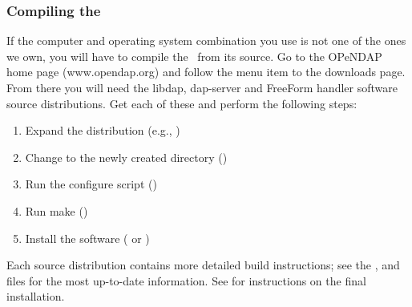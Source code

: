 \subsubsection{Compiling the \ffs}

If the computer and operating system combination you use is not one of
the ones we own, you will have to compile the \ffs\ from its source.
Go to the OPeNDAP home page (www.opendap.org) and follow the menu item
to the downloads page. From there you will need the libdap, dap-server
and FreeForm handler software source distributions. Get each of these
and perform the following steps:

\begin{enumerate}
\item Expand the distribution (e.g., )
\item Change to the newly created directory ()
\item Run the configure script ()
\item Run make ()
\item Install the software ( or )
\end{enumerate}

Each source distribution contains more detailed build instructions;
see the ,  and  files for the most
up-to-date information. See  for
instructions on the final installation.


